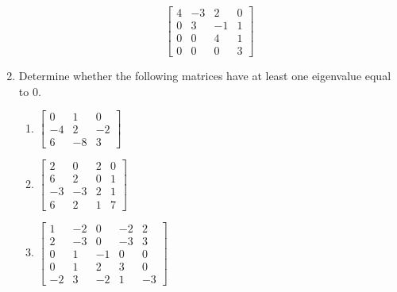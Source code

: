 \begin{enumerate}
$$\left [\begin {array}{rrrr} 4&-3&2&0\\0&3&-1&1
\\0&0&4&1\\0&0&0&3\end {array}
\right ]$$
\item Determine whether the following matrices have at least one
eigenvalue equal to 0.
\begin{enumerate}
\item $ \left [\begin{array}{rrr}0&1&0\\-4&2&-2\\6&-8&3 \end{array} \right ]$
\item $\left [\begin{array}{rrrr}
                    2&0&2&0\\
                    6&2&0&1\\
                    -3&-3&2&1\\
                    6&2&1&7\end{array} \right ]$
\item $\left [\begin{array}{rrrrr}
                    1&-2&0&-2&2\\
                    2&-3&0&-3&3\\
                    0&1&-1&0&0\\
                    0&1&2&3&0\\
                    -2&3&-2&1&-3\end{array} \right ]$
\end{enumerate}
\end{enumerate}

